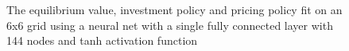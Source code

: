 \documentclass[12pt]{article}
\begin{document}
\begin{figure}[H]
  \centering
  \caption{The equilibrium value, investment policy and pricing policy fit on an 6x6 grid using a neural net with a single fully connected layer with 144 nodes and tanh activation function}
\end{figure}
\end{document}
